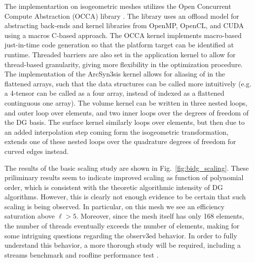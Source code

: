The implementartion on isogeometric meshes utilizes the Open Concurrent Compute Abstraction (OCCA) library \cite{MedinaPress}.  The library uses an offload model for abstracting back-ends and kernel libraries from OpenMP, OpenCL, and CUDA using a macros C-based approach.  The OCCA kernel implements macro-based just-in-time code generation so that the platform target can be identified at runtime.  Threaded barriers are also set in the application kernel to allow for thread-based granularity, giving more flexibility in the optimization procedure.  The implementation of the ArcSyn3sis kernel allows for aliasing of in the flattened arrays, such that the data structures can be called more intuitively (e.g. a 4-tensor can be called as a four array, instead of indexed as a flattened continguous one array).  The volume kernel can be written in three nested loops, and outer loop over elements, and two inner loops over the degrees of freedom of the DG basis.  The surface kernel similarly loops over elements, but then due to an added interpolation step coming form the isogeometric transformation, extends one of these nested loops over the quadrature degrees of freedom for curved edges instead.

The results of the basic scaling study are shown in Fig.~\ref{fig:bidg_scaling}.  These priliminary results seem to indicate improved scaling as function of polynomial order, which is consistent with the theoretic algorithmic intensity of DG algorithms.  However, this is clearly not enough evidence to be certain that such scaling is being observed.  In particular, on this mesh we see an efficiency saturation above $\ell>5$.  Moreover, since the mesh itself has only 168 elements, the number of threads eventually exceeds the number of elements, making for some intriguing questions regarding the observ3ed behavior.  In order to fully understand this behavior, a more thorough study will be required,  including a streams benchmark \cite{McCalpin1995} and roofline performance test \cite{Williams:2009:RIV:1498765.1498785}.


%
%







